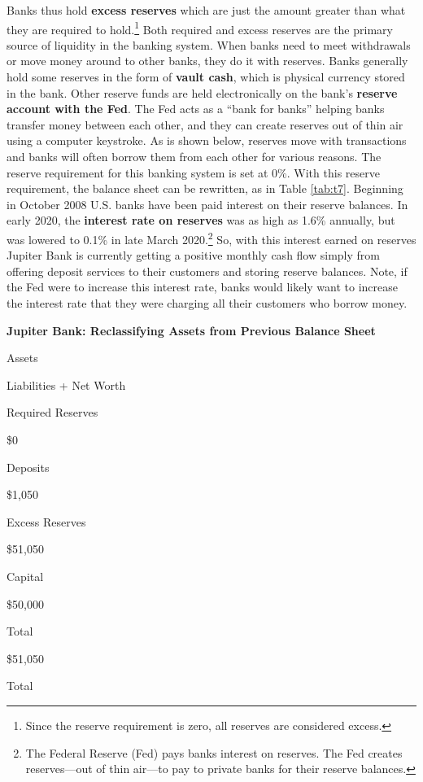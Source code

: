 \documentclass[
]{book}
\begin{document}
Banks thus hold \textbf{excess reserves} which are just the amount greater than what they are required to hold.\footnote{Since the reserve requirement is zero, all reserves are considered excess.} Both required and excess reserves are the primary source of liquidity in the banking system. When banks need to meet withdrawals or move money around to other banks, they do it with reserves. Banks generally hold some reserves in the form of \textbf{vault cash}, which is physical currency stored in the bank. Other reserve funds are held electronically on the bank's \textbf{reserve account with the Fed}. The Fed acts as a ``bank for banks'' helping banks transfer money between each other, and they can create reserves out of thin air using a computer keystroke. As is shown below, reserves move with transactions and banks will often borrow them from each other for various reasons. The reserve requirement for this banking system is set at 0\%. With this reserve requirement, the balance sheet can be rewritten, as in Table \ref{tab:t7}. Beginning in October 2008 U.S. banks have been paid interest on their reserve balances. In early 2020, the \textbf{interest rate on reserves} was as high as 1.6\% annually, but was lowered to 0.1\% in late March 2020.\footnote{The Federal Reserve (Fed) pays banks interest on reserves. The Fed creates reserves---out of thin air---to pay to private banks for their reserve balances.} So, with this interest earned on reserves Jupiter Bank is currently getting a positive monthly cash flow simply from offering deposit services to their customers and storing reserve balances. Note, if the Fed were to increase this interest rate, banks would likely want to increase the interest rate that they were charging all their customers who borrow money.

\label{tab:t7}\textbf{Jupiter Bank: Reclassifying Assets from Previous Balance Sheet}

Assets

Liabilities + Net Worth

Required Reserves

\$0

Deposits

\$1,050

Excess Reserves

\$51,050

Capital

\$50,000

Total

\$51,050

Total
\end{document}
